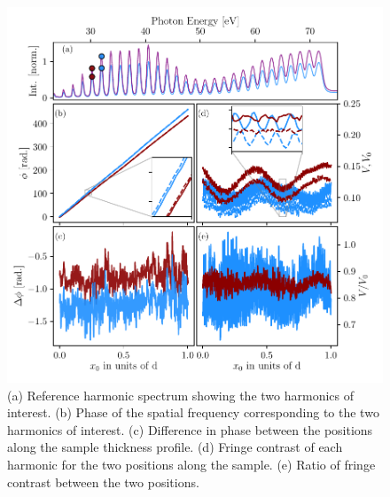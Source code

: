 \begin{figure}
	\centering
	\includegraphics[width=1.0\textwidth]{figures/refractive_index/phase_fringe_extraction.pdf}
	\caption[Fringe shift and fringe  contrast extracted from SWPG scan]{(a) Reference harmonic spectrum showing the two harmonics of interest. (b) Phase of the spatial frequency corresponding to the two harmonics of interest. (c) Difference in phase between the positions along the sample thickness profile. (d) Fringe contrast of each harmonic for the two positions along the sample.  (e) Ratio of fringe contrast between the two positions.}
	\label{fig:phase_fringe_extraction}
\end{figure}

